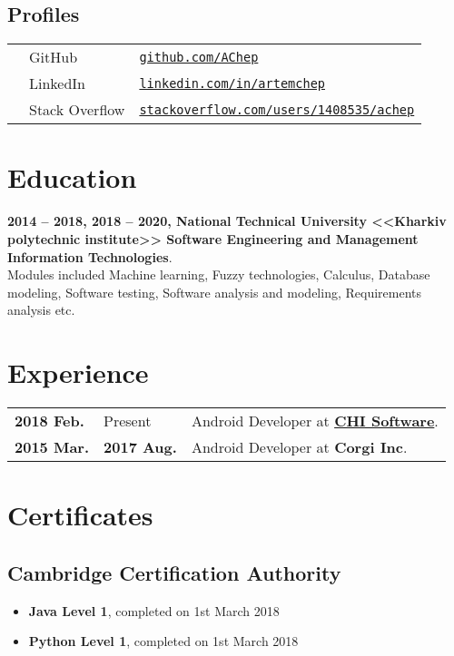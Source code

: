 \documentclass[a4paper]{article}
\begin{document}
	\subsection*{Profiles}
	\begin{tabular}{@{}lll}
		\faGithub & GitHub & \href{https://github.com/AChep}{\texttt{github.com/AChep}} \\
		\faLinkedin & LinkedIn & \href{https://www.linkedin.com/in/artemchep/}{\texttt{linkedin.com/in/artemchep}} \\
		\faStackOverflow & Stack Overflow & \href{https://stackoverflow.com/users/1408535/achep}{\texttt{stackoverflow.com/users/1408535/achep}} \\
	\end{tabular}

	\section*{Education}
	\textbf{2014 -- 2018, 2018 -- 2020, National Technical University <<Kharkiv polytechnic institute>> Software Engineering and Management Information Technologies}. \\
	Modules included Machine learning, Fuzzy technologies, Calculus, Database modeling, Software testing, Software analysis and modeling, Requirements analysis etc.

	\section*{Experience}
	\begin{tabular}{@{}l@{\enspace--\enspace}ll}
		\textbf{2018 Feb.} & Present & Android Developer at \href{https://chisw.com}{\textbf{CHI Software}}. \\
		\textbf{2015 Mar.} & \textbf{2017 Aug.} & Android Developer at \textbf{Corgi Inc}. \\
	\end{tabular}
	
	\section*{Certificates}
	\subsection*{Cambridge Certification Authority}
	\begin{itemize}
		\item \textbf{Java Level 1}, completed on 1st March 2018
		\item \textbf{Python Level 1}, completed on 1st March 2018
	\end{itemize}
\end{document}
